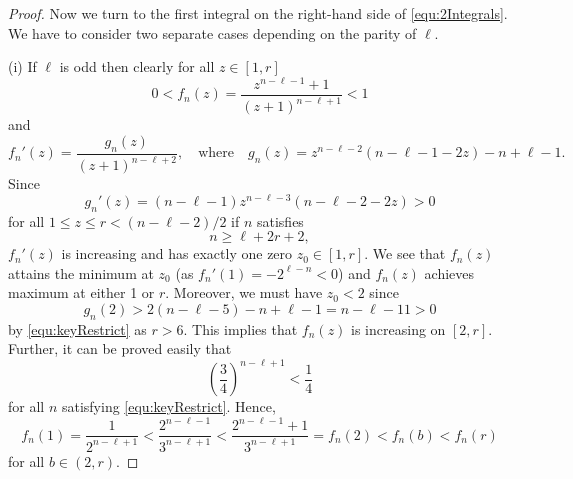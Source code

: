 \documentclass[11pt]{article}
\theoremstyle{plain}
\theoremstyle{definition}
\begin{document}
\begin{proof}
Now we turn to the first integral on the right-hand side of \eqref{equ:2Integrals}.
We have to consider two separate cases depending on the parity of $\ell$.

\medskip\noindent
(i) If $\ell$ is odd then clearly for all $z\in [1, r]$
\begin{equation*}
0< f_n(z)=\frac{z^{n-\ell-1}+1}{(z+1)^{n-\ell+1}}<1
\end{equation*}
and
\begin{equation*}
f_n'(z)=\frac{g_n(z)}{(z+1)^{n-\ell+2}}, \quad\text{where}\quad g_n(z)=z^{n-\ell-2}(n-\ell-1-2z)-n+\ell-1.
\end{equation*}
Since
\begin{equation*}
g_n'(z)=(n-\ell-1)z^{n-\ell-3}(n-\ell-2-2z)>0
\end{equation*}
for all $1\le z\le r< (n-\ell-2)/2$ if $n$ satisfies
\begin{equation}\label{equ:keyRestrict}
n\ge \ell+2r+2,
\end{equation}
$f_n'(z)$ is increasing and has exactly one zero $z_0\in [1,r]$.
We see that $f_n(z)$ attains the minimum at $z_0$ (as $f_n'(1)=-2^{\ell-n}<0$) and $f_n(z)$ achieves maximum at either 1 or $r$.
Moreover, we must have $z_0<2$ since
\begin{equation*}
g_n(2)> 2(n-\ell-5)-n+\ell-1=n-\ell-11>0
\end{equation*}
by \eqref{equ:keyRestrict} as $r>6$. This implies that $f_n(z)$ is increasing on $[2,r]$.
Further, it can be proved easily that
\begin{equation*}
\left(\frac{3}{4}\right)^{n-\ell+1}< \frac14
\end{equation*}
for all $n$ satisfying \eqref{equ:keyRestrict}. Hence,
\begin{equation}\label{equ:fbLargest}
f_n(1)=\frac{1}{2^{n-\ell+1}}<\frac{2^{n-\ell-1}}{3^{n-\ell+1}}<\frac{2^{n-\ell-1}+1}{3^{n-\ell+1}}=f_n(2)<f_n(b)<f_n(r)
\end{equation}
for all $b\in (2,r)$.


\end{proof}
\end{document}
